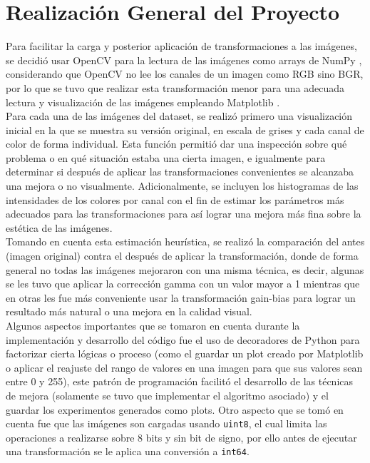\section{Realización General del Proyecto}
    Para facilitar la carga y posterior aplicación de transformaciones a las imágenes, 
    se decidió usar OpenCV \parencite{opencv_library} para la lectura de las imágenes 
    como arrays de NumPy \parencite{numpy_library}, considerando que OpenCV no lee los 
    canales de un imagen como RGB sino BGR, por lo que se tuvo que realizar esta 
    transformación menor para una adecuada lectura y visualización de las imágenes 
    empleando Matplotlib \parencite{matplotlib_library}.\\

    Para cada una de las imágenes del dataset, se realizó primero una visualización 
    inicial en la que se muestra su versión original, en escala de grises y cada 
    canal de color de forma individual. Esta función permitió dar una inspección 
    sobre qué problema o en qué situación estaba una cierta imagen, e igualmente 
    para determinar si después de aplicar las transformaciones convenientes se 
    alcanzaba una mejora o no visualmente. Adicionalmente, se incluyen los histogramas 
    de las intensidades de los colores por canal con el fin de estimar los parámetros 
    más adecuados para las transformaciones para así lograr una mejora más fina 
    sobre la estética de las imágenes.\\

    Tomando en cuenta esta estimación heurística, se realizó la comparación del antes 
    (imagen original) contra el después de aplicar la transformación, donde de forma 
    general no todas las imágenes mejoraron con una misma técnica, es decir, algunas 
    se les tuvo que aplicar la corrección gamma con un valor mayor a 1 mientras que 
    en otras les fue más conveniente usar la transformación gain-bias para lograr un 
    resultado más natural o una mejora en la calidad visual.\\

    Algunos aspectos importantes que se tomaron en cuenta durante la implementación 
    y desarrollo del código fue el uso de decoradores de Python para factorizar 
    cierta lógicas o proceso (como el guardar un plot creado por Matplotlib o aplicar 
    el reajuste del rango de valores en una imagen para que sus valores sean entre 
    0 y 255), este patrón de programación facilitó el desarrollo de las técnicas 
    de mejora (solamente se tuvo que implementar el algoritmo asociado) y el 
    guardar los experimentos generados como plots. Otro aspecto que se tomó en 
    cuenta fue que las imágenes son cargadas usando \texttt{uint8}, el cual limita 
    las operaciones a realizarse sobre 8 bits y sin bit de signo, por ello 
    antes de ejecutar una transformación se le aplica una conversión a \texttt{int64}.